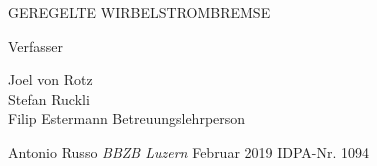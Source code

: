 \begin{titlepage} %

	\centering %
  \vspace*{10mm}
  {\LARGE GEREGELTE} %
  \newpara
  {\LARGE WIRBELSTROMBREMSE}
  \vskip 10mm
  

  {Verfasser}

	{\Large Joel von Rotz \\ Stefan Ruckli \\ \vspace{0.25\baselineskip} Filip Estermann} %
  \vskip 1cm
    Betreuungslehrperson

    {\large Antonio Russo}
  \vskip 1cm
	\textit{BBZB Luzern} %
  Februar 2019 %
	{IDPA-Nr. 1094} %


\end{titlepage}

\author{Joel von Rotz\\Stefan Ruckli\\Filip Estermann}
\date{Februar 2019}